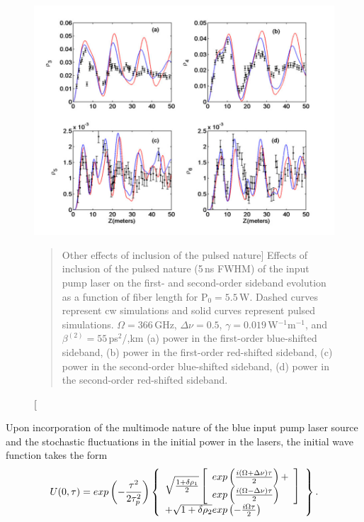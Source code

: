 \begin{figure}
\begin{center}
\includegraphics[width=5in]{nlsez55cwpulse.pdf}
\end{center}
\renewcommand{\baselinestretch}{1}
\small\normalsize
\begin{quote}
\caption
[Other effects of inclusion of the pulsed nature]
{Effects of inclusion of the pulsed nature (5\,ns FWHM) of the input pump laser on the first- and second-order sideband evolution as a function of fiber length for P$_0 = 5.5$\,W. Dashed curves represent cw simulations and solid curves represent pulsed simulations. $\Omega = 366$\,GHz, $\Delta\nu = 0.5$, $\gamma = 0.019$\,W$^{-1}$m$^{-1}$, and $\beta^{(2)} = 55$\,ps$^2$/,km (a) power in the first-order blue-shifted sideband, (b) power in the first-order red-shifted sideband, (c) power in the second-order blue-shifted sideband, (d) power in the second-order red-shifted sideband.}
\label{figA.5}
\end{quote}
\end{figure}
\renewcommand{\baselinestretch}{2}
\small\normalsize

Upon incorporation of the multimode nature of the blue input pump laser source
and the stochastic fluctuations in the initial power in the lasers, the
initial wave function takes the form
\begin{equation}
U(0,\tau) = exp\left( - {\tau^2 \over 2\tau_p^2} \right)
\left\{
\begin{array}{l}
\sqrt{{1 + \delta\rho_1 \over 2}}
\left[ \begin{array}{l}
exp \left( {i(\Omega+\Delta\nu)\tau \over 2} \right) + \\
exp \left( {i(\Omega-\Delta\nu)\tau \over 2} \right)
\end{array} \right]\\
+ \sqrt{1 + \delta\rho_2} exp\left( - {i\Omega\tau \over 2} \right)
\end{array}
\right\}.
\end{equation}

